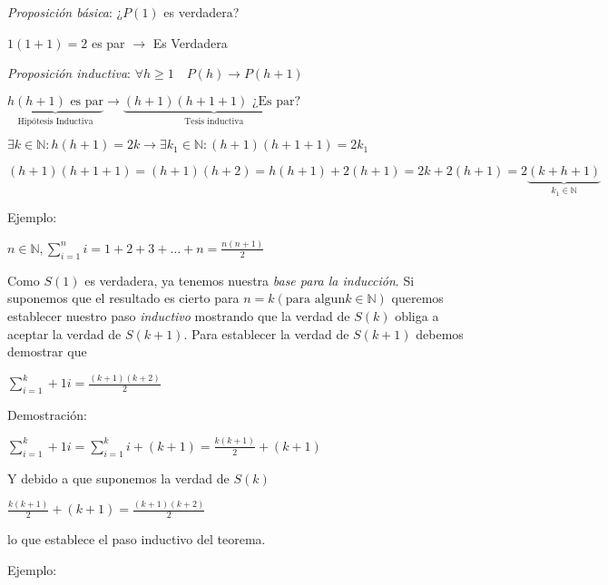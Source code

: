 \documentclass[a4paper, twoside]{article}
\begin{document}
	\emph{Proposición básica}: ¿$P(1)$ es verdadera?
	\vspace{0.25cm}
	
	$1(1+1) = 2$ es par $\rightarrow$ Es Verdadera
	
	\vspace{0.25cm}
	\emph{Proposición inductiva}: $\forall h \geq 1 \quad P(h) \rightarrow P(h+1)$
	\vspace{0.25cm}
	
	$\underbrace{h(h+1) \text{ es par}}_\text{Hipótesis Inductiva} \rightarrow \underbrace{(h+1)(h+1+1) \text{ ¿Es par? }}_\text{Tesis inductiva}$
	\vspace{0.25cm}
	
	$\exists k \in \mathbb{N}: h(h+1) = 2k \rightarrow \exists k_{1} \in \mathbb{N}: (h+1)(h+1+1) = 2k_{1}$
	\vspace{0.25cm}
	
	$(h+1)(h+1+1) = (h+1)(h+2) = h(h+1) + 2(h+1) = 2k + 2 (h+1) = 2 \underbrace{(k+h+1)}_{k_{1} \in \mathbb{N}}$
	
	Ejemplo: 
	
	\vspace{0.25cm}
	$n \in \mathbb{N}, \sum\limits_{i=1}^n i = 1 + 2 + 3 + \dots + n = \frac{n(n+1)}{2}$
	
	\vspace{0.25cm}
	Como $S(1)$ es verdadera, ya tenemos nuestra \emph{base para la inducción}. Si suponemos que el resultado es cierto para
	$n=k (\text{para algun} k \in \mathbb{N})$ queremos establecer nuestro paso \emph{inductivo} mostrando que la verdad de $S(k)$ 
	obliga a aceptar la verdad de $S(k+1)$.
	Para establecer la verdad de $S(k+1)$ debemos demostrar que
	\begin{center}
		$\sum\limits_{i=1}^k+1 i = \frac{(k+1)(k+2)}{2}$
	\end{center}	 
	 
	 Demostración:
	 \begin{center}
		$ \sum\limits_{i=1}^k+1 i = \sum\limits_{i=1}^k i + (k+1) = \frac{k(k+1)}{2} + (k+1)$
	 \end{center}
	 \vspace{0.25cm}
	 Y debido a que suponemos la verdad de $S(k)$
	 \begin{center}
		$\frac{k(k+1)}{2} + (k+1) = \frac{(k+1)(k+2)}{2}$
	 \end{center}
	 
	 lo que establece el paso inductivo del teorema.
	 
	 
	Ejemplo: 
	
\end{document}
